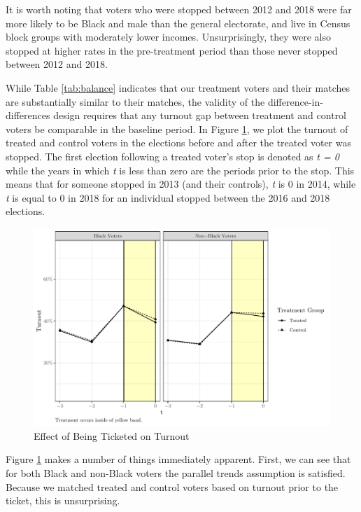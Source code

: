 \documentclass[
  12pt,
]{article}
\begin{document}
It is worth noting that voters who were stopped between 2012 and 2018 were far more likely to be Black and male than the general electorate, and live in Census block groups with moderately lower incomes. Unsurprisingly, they were also stopped at higher rates in the pre-treatment period than those never stopped between 2012 and 2018.

While Table \ref{tab:balance} indicates that our treatment voters and their matches are substantially similar to their matches, the validity of the difference-in-differences design requires that any turnout gap between treatment and control voters be comparable in the baseline period. In Figure \ref{fig:did1}, we plot the turnout of treated and control voters in the elections before and after the treated voter was stopped. The first election following a treated voter's stop is denoted as \emph{t = 0} while the years in which \emph{t} is less than zero are the periods prior to the stop. This means that for someone stopped in 2013 (and their controls), \emph{t} is 0 in 2014, while \emph{t} is equal to 0 in 2018 for an individual stopped between the 2016 and 2018 elections.

\begin{figure}[H]

{\centering \includegraphics{draft_paper_files/figure-latex/did1-1} 

}

\caption{\label{fig:did-1}Effect of Being Ticketed on Turnout}\label{fig:did1}
\end{figure}

Figure \ref{fig:did1} makes a number of things immediately apparent. First, we can see that for both Black and non-Black voters the parallel trends assumption is satisfied. Because we matched treated and control voters based on turnout prior to the ticket, this is unsurprising.
\end{document}
